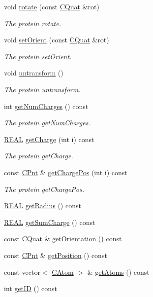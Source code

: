 \begin{DoxyCompactItemize}
void \hyperlink{classCProtein_a2ab8b5e61cd26aafde2841b6b3655d45}{rotate} (const \hyperlink{classCQuat}{C\-Quat} \&rot)
\begin{DoxyCompactList}\small\item\em The protein rotate. \end{DoxyCompactList}\item 
void \hyperlink{classCProtein_a40f7c9e8d7b4717e00027b0c92ad109b}{set\-Orient} (const \hyperlink{classCQuat}{C\-Quat} \&rot)
\begin{DoxyCompactList}\small\item\em The protein set\-Orient. \end{DoxyCompactList}\item 
void \hyperlink{classCProtein_ac7497ee640c9910a3b05ed890845b118}{untransform} ()
\begin{DoxyCompactList}\small\item\em The protein untransform. \end{DoxyCompactList}\item 
int \hyperlink{classCProtein_a8d680f9e8b07520eedfe5b43f50d1c03}{get\-Num\-Charges} () const 
\begin{DoxyCompactList}\small\item\em The protein get\-Num\-Charges. \end{DoxyCompactList}\item 
\hyperlink{util_8h_a5821460e95a0800cf9f24c38915cbbde}{R\-E\-A\-L} \hyperlink{classCProtein_a199bba5ba36900bdad8fd34bc0cc5342}{get\-Charge} (int i) const 
\begin{DoxyCompactList}\small\item\em The protein get\-Charge. \end{DoxyCompactList}\item 
const \hyperlink{classCPnt}{C\-Pnt} \& \hyperlink{classCProtein_af41397ca141fb18b7a39854797e0df6a}{get\-Charge\-Pos} (int i) const 
\begin{DoxyCompactList}\small\item\em The protein get\-Charge\-Pos. \end{DoxyCompactList}\item 
\hyperlink{util_8h_a5821460e95a0800cf9f24c38915cbbde}{R\-E\-A\-L} \hyperlink{classCProtein_aaa51486082bb376c17cf272ed9ef6bca}{get\-Radius} () const 
\item 
\hyperlink{util_8h_a5821460e95a0800cf9f24c38915cbbde}{R\-E\-A\-L} \hyperlink{classCProtein_add93b850304f89cbb6af897e1df0fe4a}{get\-Sum\-Charge} () const 
\item 
const \hyperlink{classCQuat}{C\-Quat} \& \hyperlink{classCProtein_a65cfe943745c04072d5a03b7caad861e}{get\-Orientation} () const 
\item 
const \hyperlink{classCPnt}{C\-Pnt} \& \hyperlink{classCProtein_a1290a004e6e5854a8df7aa4acf9ba8e0}{get\-Position} () const 
\item 
const vector$<$ \hyperlink{classCAtom}{C\-Atom} $>$ \& \hyperlink{classCProtein_ae44ab2afca86374611113fa26e8c1b2f}{get\-Atoms} () const 
\item 
int \hyperlink{classCProtein_aa4cd0f117c25ed7e5a84db8e70147014}{get\-I\-D} () const 
\end{DoxyCompactItemize}
